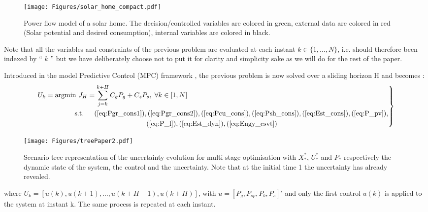 \documentclass[conference]{IEEEtran}
\begin{document}
\begin{figure}[!t]

    \begin{center}
                \texttt{[image: Figures/solar\_home\_compact.pdf]}
        \end{center}

        \caption{Power flow model of a solar home.
        The decision/controlled variables are colored in green, external data are colored in red (Solar potential and desired consumption), internal variables are colored in black.
        }
        \label{fig:solhome}
   
\end{figure}

Note that all the variables and constraints of the previous problem are evaluated at each instant $k \in \{1, \ldots, N \}$, i.e. should therefore been indexed by `` $k$ '' but we have deliberately choose not to  put it for clarity and simplicity sake as we will do for the rest of the paper.

Introduced in the model Predictive Control (MPC) framework \cite{ECaCbo2007}, the previous problem is now solved over a sliding horizon H and becomes : 
\begin{equation}\label{eq:MPCsys}
\left. 
\begin{aligned}
&U_k = \text{argmin } J_H = \sum_{j=k}^{k+H} C_gP_g + C_sP_s, \hspace{3px} \forall k \in [1, N] \\
& \text{\hspace{50px} s.t.\hspace{15px}} (\ref{eq:Pgr_cons1}),(\ref{eq:Pgr_cons2}),(\ref{eq:Pcu_cons}),(\ref{eq:Psh_cons}), (\ref{eq:Est_cons}),  (\ref{eq:P_pv}),\\
& \text{\hspace{157px}}(\ref{eq:P_l}), (\ref{eq:Est_dyn}),(\ref{eq:Engy_csvt})
\end{aligned}\right \}
\end{equation}

\begin{figure}[!b]
         \centering
    \texttt{[image: Figures/treePaper2.pdf]}
    \caption{Scenario tree representation of the uncertainty evolution for multi-stage optimisation with $X_*^*$, $U_*^*$ and $P_*$ respectively the dynamic state of the system, the control and the uncertainty. Note that at  the initial time 1  the uncertainty has already revealed. 
}
    \label{fig:Snr_tree}
\end{figure}
\noindent where $U_k = [u(k), u(k+1), \ldots,u(k+H-1), u(k+H)]$, with  $u = [ P_g,P_{sp},P_b,P_s]'$ and only the first control $u(k)$ is applied to the system at instant k. The same process is repeated at each instant. 
\end{document}
